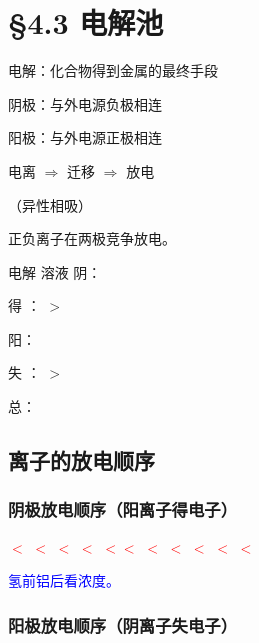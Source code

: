 \section{\S 4.3 电解池}\label{sect:电解池}

    电解：化合物得到金属的最终手段

    阴极：与外电源负极相连

    阳极：与外电源正极相连

    电离 \(\Rightarrow\) 迁移 \(\Rightarrow\) 放电

    （异性相吸）

    正负离子在两极竞争放电。

    \begin{center}
    
    \end{center}

    \begin{xmp}{电解  溶液}
        阴：

         得 ： \(>\) 

        阳：

         失 ： \(>\) 

        总：
    \end{xmp}

    \subsection{离子的放电顺序}\label{subsec:离子放电顺序}

        \subsubsection{阴极放电顺序（阳离子得电子）}\label{subsubsec:阴极放电顺序}

            \textcolor{red}{ \(<\)  \(<\)  \(<\)  \(<\)  \(<\)}\textcolor{red}{}\textcolor{red}{\(<\)  \(<\)  \(<\) }\textcolor{red}{\(<\)  \(<\)  \(<\) }

            \textcolor{blue}{ 氢前铝后看浓度。}

        \subsubsection{阳极放电顺序（阴离子失电子）}\label{subsubsec:阳极放电顺序}

